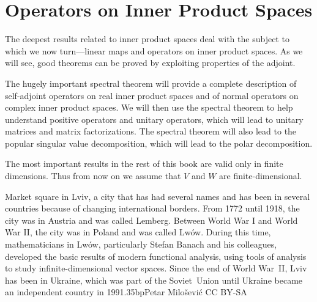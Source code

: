 
\chapter{Operators on Inner Product Spaces} \label{opsinner}  %

The deepest results related to inner product spaces deal with the subject to which we now turn---linear maps and operators on inner product spaces. As we will see, good theorems can be proved by exploiting properties of the adjoint.

The hugely important spectral theorem will provide a complete description of self-adjoint operators on real inner product spaces and of normal operators on complex inner product spaces.  We will then use the spectral theorem to help understand positive operators and unitary operators, which will lead to unitary matrices and matrix factorizations.
The spectral theorem will also lead to the popular singular value decomposition, which will lead to the polar decomposition.

The most important results in the rest of this book are valid only in finite \mbox{dimensions}. Thus from now on we assume that $V$ and $W$ are finite-dimensional.

%
{Market square in Lviv, a city that has had several names and has been in several countries because of changing international borders. From 1772 until 1918, the city was in Austria and was called Lemberg. Between World War I and World War II, the city was in Poland and was called Lw\'ow. During this time, mathematicians in Lw\'ow, particularly Stefan Banach  and his colleagues, developed the basic results of modern functional analysis, using tools of analysis to study infinite-dimensional vector spaces. Since the end of World War~II, Lviv has been in Ukraine, which was part of the Soviet~Union until Ukraine became an independent country in 1991.}{35bp}{Petar Milo\v{s}evi\'c CC BY-SA}

